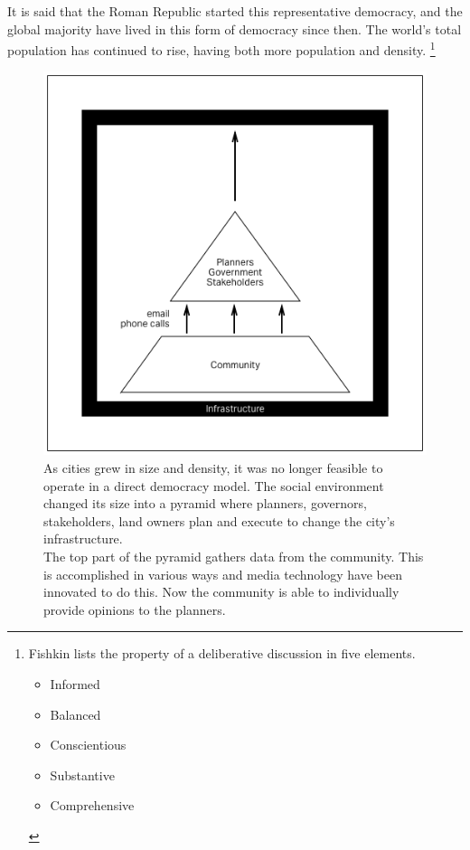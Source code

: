 
It is said that the Roman Republic started this representative democracy, and the global majority have lived in this form of democracy since then. The world's total population has continued to rise, having both more population and density.
\footnote{Fishkin lists the property of a deliberative discussion in five elements. \cite{fishkin2005experimenting}
\begin{itemize}
    \item Informed
    \item Balanced
    \item Conscientious
    \item Substantive
    \item Comprehensive
\end{itemize}
}


\begin{figure}[!htb]
  \includegraphics[width=\textwidth]{chapters/2/fig/opinion.png}               
  \caption[representative democracy]{As cities grew in size and density, it was no longer feasible to operate in a direct democracy model. The social environment changed its size into a pyramid where planners, governors, stakeholders, land owners plan and execute to change the city's infrastructure.\\ The top part of
the pyramid gathers data from the community. This is accomplished in various ways and media technology have been innovated to do this. Now the community is able to individually provide opinions to the planners.}
  \label{fig:diagarm_opinion}
\end{figure}

